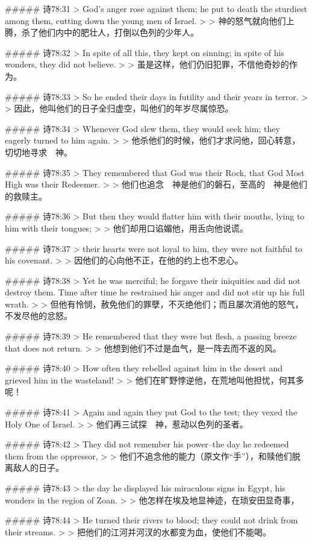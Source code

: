 ##### 诗78:31
> God's anger rose against them; he put to death the sturdiest among them, cutting down the young men of Israel.
>
> 神的怒气就向他们上腾，杀了他们内中的肥壮人，打倒以色列的少年人。


##### 诗78:32
> In spite of all this, they kept on sinning; in spite of his wonders, they did not believe.
>
> 虽是这样，他们仍旧犯罪，不信他奇妙的作为。


##### 诗78:33
> So he ended their days in futility and their years in terror.
>
> 因此，他叫他们的日子全归虚空，叫他们的年岁尽属惊恐。


##### 诗78:34
> Whenever God slew them, they would seek him; they eagerly turned to him again.
>
> 他杀他们的时候，他们才求问他，回心转意，切切地寻求　神。


##### 诗78:35
> They remembered that God was their Rock, that God Most High was their Redeemer.
>
> 他们也追念　神是他们的磐石，至高的　神是他们的救赎主。


##### 诗78:36
> But then they would flatter him with their mouths, lying to him with their tongues;
>
> 他们却用口谄媚他，用舌向他说谎。


##### 诗78:37
> their hearts were not loyal to him, they were not faithful to his covenant.
>
> 因他们的心向他不正，在他的约上也不忠心。


##### 诗78:38
> Yet he was merciful; he forgave their iniquities and did not destroy them. Time after time he restrained his anger and did not stir up his full wrath.
>
> 但他有怜悯，赦免他们的罪孽，不灭绝他们；而且屡次消他的怒气，不发尽他的忿怒。


##### 诗78:39
> He remembered that they were but flesh, a passing breeze that does not return.
>
> 他想到他们不过是血气，是一阵去而不返的风。


##### 诗78:40
> How often they rebelled against him in the desert and grieved him in the wasteland!
>
> 他们在旷野悖逆他，在荒地叫他担忧，何其多呢！


##### 诗78:41
> Again and again they put God to the test; they vexed the Holy One of Israel.
>
> 他们再三试探　神，惹动以色列的圣者。


##### 诗78:42
> They did not remember his power--the day he redeemed them from the oppressor,
>
> 他们不追念他的能力（原文作“手”），和赎他们脱离敌人的日子。


##### 诗78:43
> the day he displayed his miraculous signs in Egypt, his wonders in the region of Zoan.
>
> 他怎样在埃及地显神迹，在琐安田显奇事，


##### 诗78:44
> He turned their rivers to blood; they could not drink from their streams.
>
> 把他们的江河并河汊的水都变为血，使他们不能喝。



